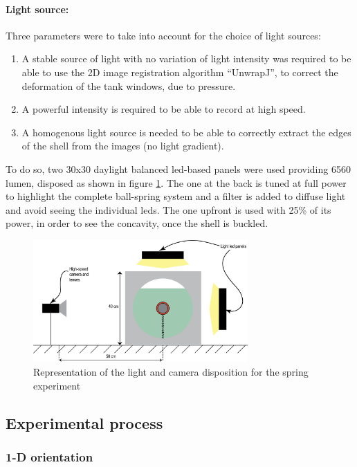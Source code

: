 \paragraph{Light source:}
Three parameters were to take into account for the choice of light sources:
\begin{enumerate}
	\item A stable source of light with no variation of light intensity was required to be able to use the 2D image registration algorithm "`UnwrapJ"', to correct the deformation of the tank windows, due to pressure.
	\item A powerful intensity is required to be able to record at high speed.
	\item A homogenous light source is needed to be able to correctly extract the edges of the shell from the images (no light gradient).	
\end{enumerate}
To do so, two 30x30 daylight balanced led-based panels were used providing 6560 lumen, disposed as shown in figure \ref{fig:schematics_spring}. The one at the back is tuned at full power to highlight the complete ball-spring system and a filter is added to diffuse light and avoid seeing the individual leds. The one upfront is used with 25\% of its power, in order to see the concavity, once the shell is buckled.
\begin{figure}[H] %
	\centering%
  \includegraphics[width=0.73\textwidth]{figures/Chapter_1/schematic_experimental_setup_light_lenses.png}
	\caption{Representation of the light and camera disposition for the spring experiment}
	\label{fig:schematics_spring}
\end{figure}
\newpage
\subsection{Experimental process}
\subsubsection{1-D orientation}
